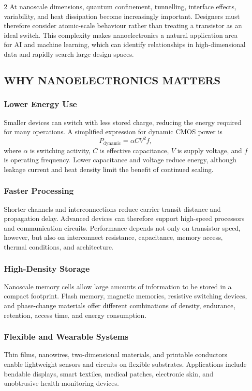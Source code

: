 \begin{multicols}{2}
  \noindent
  At nanoscale dimensions, quantum confinement, tunnelling, interface effects, variability, and heat dissipation become increasingly important. Designers must therefore consider atomic-scale behaviour rather than treating a transistor as an ideal switch. This complexity makes nanoelectronics a natural application area for AI and machine learning, which can identify relationships in high-dimensional data and rapidly search large design spaces.

  \subsection*{\centering\uppercase{Why Nanoelectronics Matters}}
  \subsubsection*{Lower Energy Use}
  Smaller devices can switch with less stored charge, reducing the energy required for many operations. A simplified expression for dynamic CMOS power is
  \[
    P_{\mathrm{dynamic}}=\alpha C V^2 f,
  \]
  where $\alpha$ is switching activity, $C$ is effective capacitance, $V$ is supply voltage, and $f$ is operating frequency. Lower capacitance and voltage reduce energy, although leakage current and heat density limit the benefit of continued scaling.

  \subsubsection*{Faster Processing}
  Shorter channels and interconnections reduce carrier transit distance and propagation delay. Advanced devices can therefore support high-speed processors and communication circuits. Performance depends not only on transistor speed, however, but also on interconnect resistance, capacitance, memory access, thermal conditions, and architecture.

  \subsubsection*{High-Density Storage}
  Nanoscale memory cells allow large amounts of information to be stored in a compact footprint. Flash memory, magnetic memories, resistive switching devices, and phase-change materials offer different combinations of density, endurance, retention, access time, and energy consumption.

  \subsubsection*{Flexible and Wearable Systems}
  Thin films, nanowires, two-dimensional materials, and printable conductors enable lightweight sensors and circuits on flexible substrates. Applications include bendable displays, smart textiles, medical patches, electronic skin, and unobtrusive health-monitoring devices.


\end{multicols}
